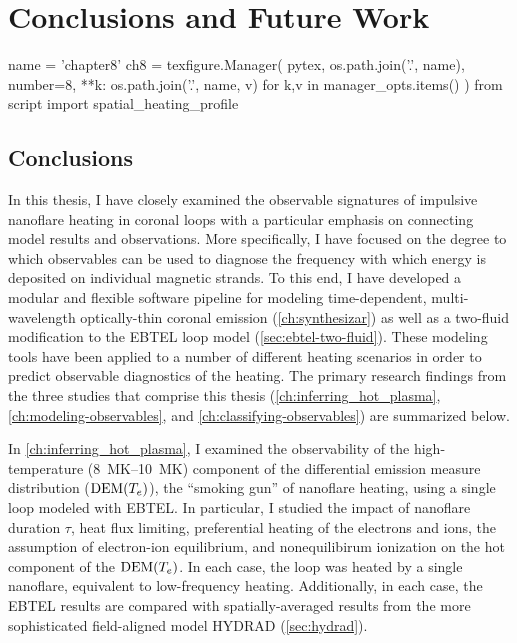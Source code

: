 \chapter{Conclusions and Future Work}\label{ch:conclusions}

\begin{pycode}[chapter8]
name = 'chapter8'
ch8 = texfigure.Manager(
    pytex,
    os.path.join('.', name),
    number=8,
    **{k: os.path.join('.', name, v) for k,v in manager_opts.items()}
)
from script import spatial_heating_profile
\end{pycode}

\section{Conclusions}\label{sec:conclusions}

In this thesis, I have closely examined the observable signatures of impulsive nanoflare heating in \AR{} coronal loops with a particular emphasis on connecting model results and observations. More specifically, I have focused on the degree to which observables can be used to diagnose the frequency with which energy is deposited on individual magnetic strands. To this end, I have developed a modular and flexible software pipeline for modeling time-dependent, multi-wavelength optically-thin coronal emission (\autoref{ch:synthesizar}) as well as a two-fluid modification to the EBTEL loop model (\autoref{sec:ebtel-two-fluid}). These modeling tools have been applied to a number of different heating scenarios in order to predict observable diagnostics of the heating. The primary research findings from the three studies that comprise this thesis (\autoref{ch:inferring_hot_plasma}, \autoref{ch:modeling-observables}, and \autoref{ch:classifying-observables}) are summarized below.

In \autoref{ch:inferring_hot_plasma}, I examined the observability of the high-temperature (\SIrange{8}{10}{\mega\kelvin}) component of the differential emission measure distribution ($\textup{DEM}(T_e)$), the ``smoking gun'' of nanoflare heating, using a single loop modeled with EBTEL. In particular, I studied the impact of nanoflare duration $\tau$, heat flux limiting, preferential heating of the electrons and ions, the assumption of electron-ion equilibrium, and nonequilibirum ionization on the hot component of the $\textup{DEM}(T_e)$. In each case, the loop was heated by a single nanoflare, equivalent to low-frequency heating. Additionally, in each case, the EBTEL results are compared with spatially-averaged results from the more sophisticated field-aligned model HYDRAD (\autoref{sec:hydrad}).

